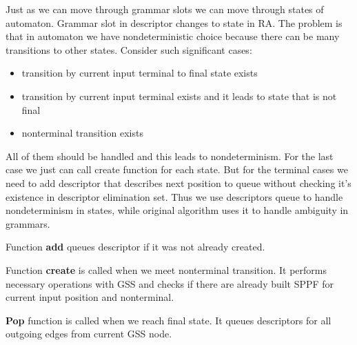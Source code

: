 \documentclass[runningheads,a4paper]{llncs}
\begin{document}
Just as we can move through grammar slots we can move through states 
of automaton. Grammar slot in descriptor changes to state in RA.
The problem is that in automaton we have nondeterministic choice because there can be 
many transitions to other states. Consider such significant cases:
\begin{itemize} 
\item transition by current input terminal to final state exists
\item transition by current input terminal exists and it leads to state that is not final 
\item nonterminal transition exists
\end{itemize}
All of them should be handled and this leads to nondeterminism. 
For the last case we just can call create function for each state.
But for the terminal cases we need to add descriptor that describes
next position to queue without checking it's existence in descriptor elimination set.
Thus we use descriptors queue to handle nondeterminism in states, while original algorithm uses it to 
handle ambiguity in grammars.



Function \textbf{add} queues descriptor if it was not already created.


Function \textbf{create} is called when we meet nonterminal transition.
It performs necessary operations with GSS and checks if there are already built SPPF for current
input position and nonterminal.

\textbf{Pop} function is called when we reach final state. It queues descriptors for all outgoing edges from current GSS node.
\end{document}
